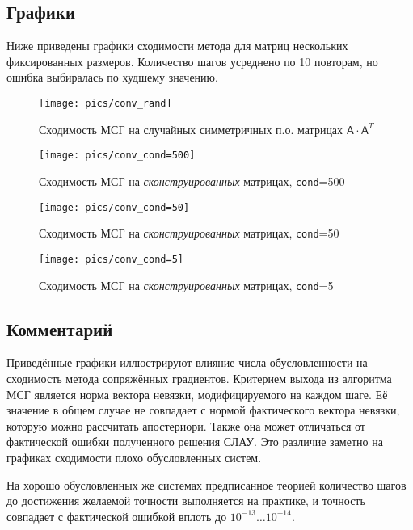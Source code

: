\subsection{Графики}
Ниже приведены графики сходимости метода для матриц нескольких фиксированных размеров. Количество шагов усреднено по 10 повторам, но ошибка выбиралась по худшему значению.
\begin{figure}[H]
    \centering
    \caption{Сходимость МСГ на случайных симметричных п.о. матрицах $\mathsf{A} \cdot \mathsf{A}^T$}
    \texttt{[image: pics/conv\_rand]}
    \label{fig:1}
\end{figure}
\begin{figure}[H]
    \centering
    \caption{Сходимость МСГ на {\it сконструированных} матрицах, \texttt{cond}=500}
    \texttt{[image: pics/conv\_cond=500]}
    \label{fig:2}
\end{figure}
\begin{figure}[H]
    \centering
    \caption{Сходимость МСГ на {\it сконструированных} матрицах, \texttt{cond}=50}
    \texttt{[image: pics/conv\_cond=50]}
    \label{fig:3}
\end{figure}
\begin{figure}[H]
    \centering
    \caption{Сходимость МСГ на {\it сконструированных} матрицах, \texttt{cond}=5}
    \texttt{[image: pics/conv\_cond=5]}
    \label{fig:4}
\end{figure}

\subsection{Комментарий}
Приведённые графики иллюстрируют влияние числа обусловленности на сходимость метода сопряжённых градиентов. Критерием выхода из алгоритма МСГ является норма вектора невязки, модифицируемого на каждом шаге. Её значение в общем случае не совпадает с нормой фактического вектора невязки, которую можно рассчитать апостериори. Также она может отличаться от фактической ошибки полученного решения СЛАУ. Это различие заметно на графиках сходимости плохо обусловленных систем.

На хорошо обусловленных же системах предписанное теорией количество шагов до достижения желаемой точности выполняется на практике, и точность совпадает с фактической ошибкой вплоть до $10^{-13}\ldots10^{-14}$.


